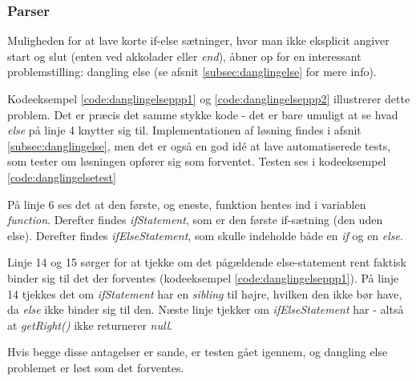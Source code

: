\subsubsection{Parser}
\label{subsec:parser}

Muligheden for at lave korte if-else sætninger, hvor man ikke eksplicit angiver start og slut (enten ved akkolader eller \textit{end}), åbner op for en interessant problemstilling: dangling else (se afsnit \ref{subsec:danglingelse} for mere info). 



\noindent Kodeeksempel \ref{code:danglingelseppp1} og \ref{code:danglingelseppp2} illustrerer dette problem. Det er præcis det samme stykke kode - det er bare umuligt at se hvad \textit{else} på linje 4 knytter sig til. Implementationen af løsning findes i afsnit \ref{subsec:danglingelse}, men det er også en god idé at lave automatiserede tests, som tester om løsningen opfører sig som forventet. Testen ses i kodeeksempel \ref{code:danglingelsetest}


\noindent På linje 6 ses det at den første, og eneste, funktion hentes ind i variablen \textit{function}. Derefter findes \textit{ifStatement}, som er den første if-sætning (den uden else). Derefter findes \textit{ifElseStatement}, som skulle indeholde både en \textit{if} og en \textit{else}.

\noindent Linje 14 og 15 sørger for at tjekke om det pågældende else-statement rent faktisk binder sig til det der forventes (kodeeksempel \ref{code:danglingelseppp1}). På linje 14 tjekkes det om \textit{ifStatement} har en \textit{sibling} til højre, hvilken den ikke bør have, da \textit{else} ikke binder sig til den. Næste linje tjekker om \textit{ifElseStatement} har - altså at \textit{getRight()} ikke returnerer \textit{null}. 

Hvis begge disse antagelser er sande, er testen gået igennem, og dangling else problemet er løst som det forventes.
